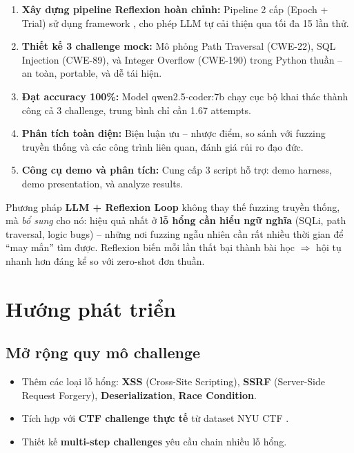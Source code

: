 \documentclass{nt521report}
\begin{document}
\begin{enumerate}
  \item \textbf{Xây dựng pipeline Reflexion hoàn chỉnh:} Pipeline 2 cấp (Epoch + Trial) sử dụng framework , cho phép LLM tự cải thiện qua tối đa 15 lần thử.

  \item \textbf{Thiết kế 3 challenge mock:} Mô phỏng Path Traversal (CWE-22), SQL Injection (CWE-89), và Integer Overflow (CWE-190) trong Python thuần -- an toàn, portable, và dễ tái hiện.

  \item \textbf{Đạt accuracy 100\%:} Model qwen2.5-coder:7b chạy cục bộ khai thác thành công cả 3 challenge, trung bình chỉ cần 1.67 attempts.

  \item \textbf{Phân tích toàn diện:} Biện luận ưu -- nhược điểm, so sánh với fuzzing truyền thống và các công trình liên quan, đánh giá rủi ro đạo đức.

  \item \textbf{Công cụ demo và phân tích:} Cung cấp 3 script hỗ trợ: demo harness, demo presentation, và analyze results.
\end{enumerate}

\begin{notebox}[title={Kết luận chính}]
  Phương pháp \textbf{LLM + Reflexion Loop} không thay thế fuzzing truyền thống, mà \textit{bổ sung} cho nó: hiệu quả nhất ở \textbf{lỗ hổng cần hiểu ngữ nghĩa} (SQLi, path traversal, logic bugs) -- những nơi fuzzing ngẫu nhiên cần rất nhiều thời gian để ``may mắn'' tìm được. Reflexion biến mỗi lần thất bại thành bài học $\Rightarrow$ hội tụ nhanh hơn đáng kể so với zero-shot đơn thuần.
\end{notebox}

\section{Hướng phát triển}
\label{sec:future-work}

\subsection{Mở rộng quy mô challenge}

\begin{itemize}
  \item Thêm các loại lỗ hổng: \textbf{XSS} (Cross-Site Scripting), \textbf{SSRF} (Server-Side Request Forgery), \textbf{Deserialization}, \textbf{Race Condition}.
  \item Tích hợp với \textbf{CTF challenge thực tế} từ dataset NYU CTF \cite{shao2024nyu_ctf}.
  \item Thiết kế \textbf{multi-step challenges} yêu cầu chain nhiều lỗ hổng.
\end{itemize}
\end{document}
